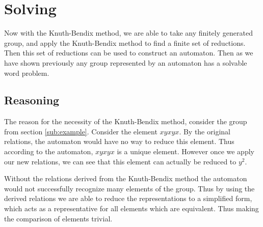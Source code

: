 \documentclass[10pt]{amsart}
\theoremstyle{definition}
\begin{document}
\section{Solving}%
\label{sec:solving}

Now with the Knuth-Bendix method, we are able to take any finitely generated
group, and apply the Knuth-Bendix method to find a finite set of reductions.
Then this set of reductions can be used to construct an automaton. Then as we
have shown previously any group represented by an automaton has a solvable word
problem.

\subsection{Reasoning}%
\label{sub:reasoning}

The reason for the necessity of the Knuth-Bendix method, consider the group
from section \ref{sub:example}. Consider the element $xyxyx$. By the original
relations, the automaton would have no way to reduce this element. Thus
according to the automaton, $xyxyx$ is a unique element. However once we apply
our new relations, we can see that this element can actually be reduced to
$y^2$.

Without the relations derived from the Knuth-Bendix method the automaton would
not successfully recognize many elements of the group. Thus by using the
derived relations we are able to reduce the representations to a simplified
form, which acts as a representative for all elements which are equivalent.
Thus making the comparison of elements trivial.

\nocite{*}


\end{document}
